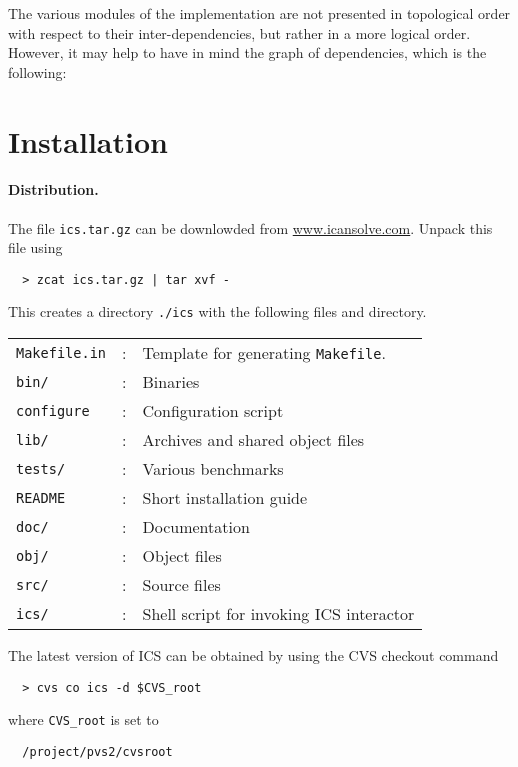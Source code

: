 \documentclass[12pt]{article}
\begin{document}
The various modules of the implementation are not presented in
topological order with respect to their inter-dependencies, but
rather in a more logical order. However, it may help to have in mind
the graph of dependencies, which is the following:


\epsfxsize=15cm
\begin{center}
\end{center}


\section{Installation}\label{sec:installation}

\paragraph{Distribution.}
The file \texttt{ics.tar.gz} can be downlowded from \url{www.icansolve.com}.
Unpack this file using
  \begin{verbatim}
  > zcat ics.tar.gz | tar xvf -
  \end{verbatim}
This creates a directory \texttt{./ics} with the following files
and directory.\\
  \begin{tabular}{lcl}
   \texttt{Makefile.in}  & : & Template for generating \texttt{Makefile}.  \\
   \texttt{bin/} & : & Binaries \\
   \texttt{configure} & : & Configuration script \\
   \texttt{lib/} & : & Archives and shared object files  \\
   \texttt{tests/} & : & Various benchmarks  \\
   \texttt{README} & : & Short installation guide  \\
   \texttt{doc/} & : & Documentation \\
   \texttt{obj/} & : & Object files \\
   \texttt{src/} & : & Source files \\
   \texttt{ics/} & : & Shell script for invoking ICS interactor\\
  \end{tabular}

The latest version of ICS can be obtained by using the
CVS checkout command
  \begin{verbatim}
  > cvs co ics -d $CVS_root
  \end{verbatim} %
where \texttt{CVS\_root} is set to
  \begin{verbatim}
  /project/pvs2/cvsroot
  \end{verbatim}
\end{document}

